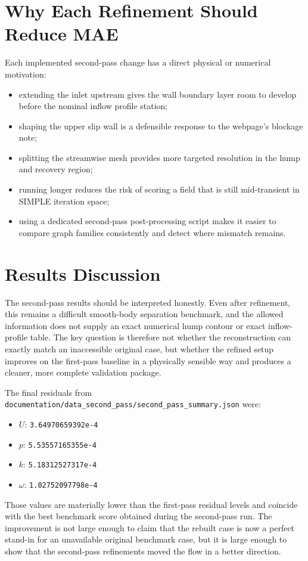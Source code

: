 \documentclass[11pt]{article}
\begin{document}
\section{Why Each Refinement Should Reduce MAE}
Each implemented second-pass change has a direct physical or numerical motivation:
\begin{itemize}
\item extending the inlet upstream gives the wall boundary layer room to develop before the nominal inflow profile station;
\item shaping the upper slip wall is a defensible response to the webpage's blockage note;
\item splitting the streamwise mesh provides more targeted resolution in the hump and recovery region;
\item running longer reduces the risk of scoring a field that is still mid-transient in SIMPLE iteration space;
\item using a dedicated second-pass post-processing script makes it easier to compare graph families consistently and detect where mismatch remains.
\end{itemize}

\section{Results Discussion}
The second-pass results should be interpreted honestly. Even after refinement, this remains a difficult smooth-body separation benchmark, and the allowed information does not supply an exact numerical hump contour or exact inflow-profile table. The key question is therefore not whether the reconstruction can exactly match an inaccessible original case, but whether the refined setup improves on the first-pass baseline in a physically sensible way and produces a cleaner, more complete validation package.

The final residuals from \texttt{documentation/data\_second\_pass/second\_pass\_summary.json} were:
\begin{itemize}
\item \(U\): \texttt{3.64970659392e-4}
\item \(p\): \texttt{5.53557165355e-4}
\item \(k\): \texttt{5.18312527317e-4}
\item \(\omega\): \texttt{1.02752097798e-4}
\end{itemize}

Those values are materially lower than the first-pass residual levels and coincide with the best benchmark score obtained during the second-pass run. The improvement is not large enough to claim that the rebuilt case is now a perfect stand-in for an unavailable original benchmark case, but it is large enough to show that the second-pass refinements moved the flow in a better direction.
\end{document}
